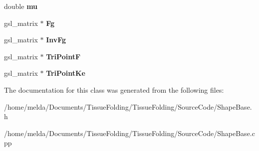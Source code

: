 \begin{DoxyCompactItemize}
\item 
\hypertarget{classShapeBase_ac5819d0d117e5510611259177c477af8}{}double {\bfseries mu}\label{classShapeBase_ac5819d0d117e5510611259177c477af8}

\item 
\hypertarget{classShapeBase_a4156d7c7f91f0b528214b74277279df0}{}gsl\+\_\+matrix $\ast$ {\bfseries Fg}\label{classShapeBase_a4156d7c7f91f0b528214b74277279df0}

\item 
\hypertarget{classShapeBase_afe7cb600a9316597a16512ab7b6fcd6f}{}gsl\+\_\+matrix $\ast$ {\bfseries Inv\+Fg}\label{classShapeBase_afe7cb600a9316597a16512ab7b6fcd6f}

\item 
\hypertarget{classShapeBase_ab7ac8f14929ab37e8eae5fcaf93b18a8}{}gsl\+\_\+matrix $\ast$ {\bfseries Tri\+Point\+F}\label{classShapeBase_ab7ac8f14929ab37e8eae5fcaf93b18a8}

\item 
\hypertarget{classShapeBase_ace20710f27099833509c474b221c25df}{}gsl\+\_\+matrix $\ast$ {\bfseries Tri\+Point\+Ke}\label{classShapeBase_ace20710f27099833509c474b221c25df}

\end{DoxyCompactItemize}


The documentation for this class was generated from the following files\+:\begin{DoxyCompactItemize}
\item 
/home/melda/\+Documents/\+Tissue\+Folding/\+Tissue\+Folding/\+Source\+Code/Shape\+Base.\+h\item 
/home/melda/\+Documents/\+Tissue\+Folding/\+Tissue\+Folding/\+Source\+Code/Shape\+Base.\+cpp\end{DoxyCompactItemize}
